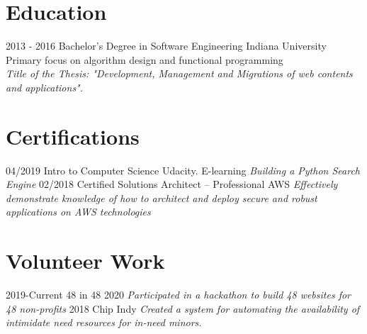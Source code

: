\documentclass[]{friggeri-cv}
\begin{document}
\section{Education}
\begin{entrylist}
  \entry
    {2013 - 2016}
    {Bachelor's Degree in Software Engineering}
    {Indiana University}
    {Primary focus on algorithm design and functional programming \\
    \emph{Title of the Thesis: "Development, Management and Migrations of web contents and applications".}\\
    }
\end{entrylist}

\section{Certifications}
\begin{entrylist}
  \entry
    {04/2019}
    {Intro to Computer Science}
    {Udacity. E-learning}
    {\emph{Building a Python Search Engine}}
     \entry
    {02/2018}
    {Certified Solutions Architect – Professional }
    {AWS}
    {\emph{Effectively demonstrate knowledge of how to architect and deploy secure and robust applications on AWS technologies}}
\end{entrylist}
\section{Volunteer Work}
\begin{entrylist}
	\entry
	{2019-Current}
	{48 in 48 2020 }
	{}
	{\emph{Participated in a hackathon to build 48 websites for 48 non-profits}}
	\entry
	{2018}
	{Chip Indy}
	{}
	{\emph{Created a system for automating the availability of intimidate need resources for in-need minors.}}
\end{entrylist}
\end{document}
